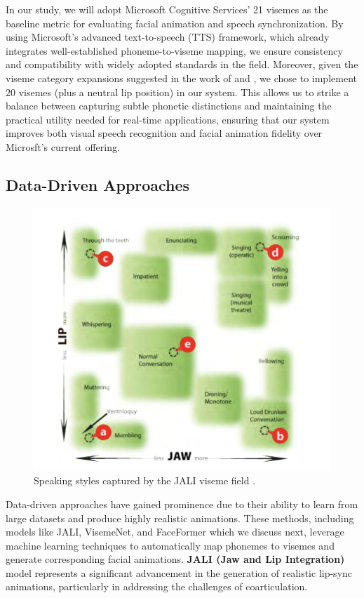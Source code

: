 \documentclass[12pt]{article}
\begin{document}
In our study, we will adopt Microsoft Cognitive Services' 21 visemes  as the baseline metric for evaluating facial animation and speech synchronization. By using Microsoft’s advanced text-to-speech (TTS) framework, which already integrates well-established phoneme-to-viseme mapping, we ensure consistency and compatibility with widely adopted standards in the field. Moreover, given the viseme category expansions suggested in the work of \cite{Xu2013AGames} and \cite{Cappelletta2012Phoneme-to-visemeRecognition}, we chose to implement 20 visemes (plus a neutral lip position) in our system. This allows us to strike a balance between capturing subtle phonetic distinctions and maintaining the practical utility needed for real-time applications, ensuring that our system improves both visual speech recognition and facial animation fidelity over Microsft's current offering.

\subsection{Data-Driven Approaches}
\label{sec:datadriven}
\begin{figure}
\centering
\vspace{-5mm}
\includegraphics[width=\linewidth]{jali.png}
\caption{Speaking styles captured by the JALI viseme field \cite{Edwards2016}.}
\label{fig:jali-viseme-field}
\vspace{-15mm}
\end{figure}
Data-driven approaches have gained prominence due to their ability to learn from large datasets and produce highly realistic animations. These methods,   including models like JALI, VisemeNet, and FaceFormer which we discuss next, 
leverage machine learning techniques to automatically map phonemes to visemes and generate corresponding facial animations.
{\bf JALI (Jaw and Lip Integration)} model  \cite{Edwards2016}  represents a significant advancement in the generation of realistic lip-sync animations, particularly in addressing the challenges of coarticulation.
\end{document}
